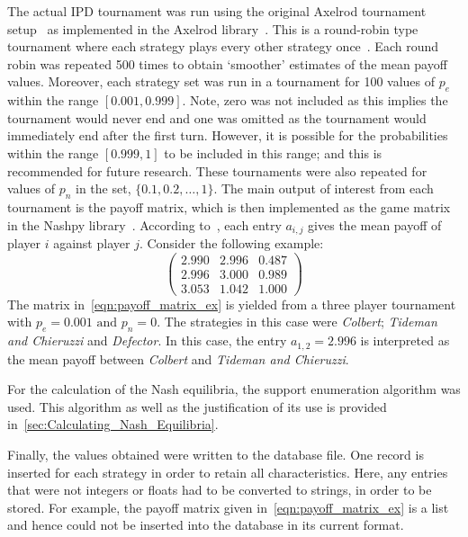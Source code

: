 The actual IPD tournament was run using the original Axelrod tournament
setup~\cite{adeoye2012application} as implemented in the
Axelrod library~\cite{axelrodproject}. This is a round-robin type tournament where each
strategy plays every other strategy once~\cite{axelrod1980effective}.
Each round robin was repeated 500 times to obtain `smoother' estimates of
the mean payoff values. Moreover, each strategy set was run in a tournament for
100 values of \(p_{e}\) within the range \([0.001, 0.999]\). Note, zero was
not included as this implies the tournament would never end and one was
omitted as the tournament would immediately end after the first turn. However,
it is possible for the probabilities within the range \([0.999, 1]\) to be
included in this range; and this is recommended for
future research. These tournaments were also repeated for values of \(p_{n}\) in the set, \( \{0.1, 0.2, \ldots, 1\} \). The main output of interest
from each tournament is the payoff matrix, which is then implemented as the game
matrix in the Nashpy library~\cite{Nashpy2019}.
According to~\cite{axelrodproject}, each entry \(a_{i,j}\) gives the mean payoff
of player \(i\) against player \(j\). Consider the following example:
\begin{equation}
    \begin{pmatrix}
        2.990 &   2.996  &   0.487\\  
        2.996 &   3.000  &   0.989\\
        3.053 &   1.042  &   1.000        
    \end{pmatrix}
\end{equation}\label{eqn:payoff_matrix_ex}
The matrix in~\eqref{eqn:payoff_matrix_ex} is yielded from a three player
tournament with \(p_{e}=0.001 \text{ and } p_{n}=0\). The strategies in this case were \textit{Colbert}; \textit{Tideman and Chieruzzi} and
\textit{Defector}. In this case, the entry \(a_{1,2} = 2.996\) is interpreted as the
mean payoff between \textit{Colbert} and \textit{Tideman and Chieruzzi}. 

For the calculation of the Nash equilibria, the support enumeration
algorithm was used. This algorithm as well as the justification of its use is
provided in~\autoref{sec:Calculating_Nash_Equilibria}.

Finally, the values obtained were written to the database file. One record is
inserted for each strategy in order to retain all characteristics. Here, any
entries that were not integers or floats had to be converted to strings, in order
to be stored. For example, the payoff matrix given
in~\eqref{eqn:payoff_matrix_ex} is a list and hence could not be inserted into the
database in its current format.


